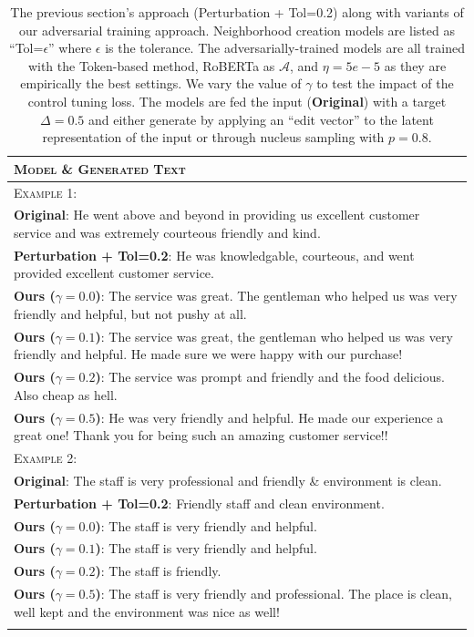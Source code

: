   \begin{table}[htb]
  \small
  \centering
  \caption{The previous section's approach (Perturbation + Tol=0.2) along with variants of our adversarial training approach. Neighborhood creation models are listed as ``Tol=$\epsilon$'' where $\epsilon$ is the tolerance. The adversarially-trained models are all trained with the Token-based method, RoBERTa as $\mathcal{A}$, and $\eta=5e-5$ as they are empirically the best settings. We vary the value of $\gamma$ to test the impact of the control tuning loss. The models are fed the input (\ie \textbf{Original}) with a target $\Delta=0.5$ and either generate by applying an ``edit vector'' to the latent representation of the input or through nucleus sampling with $p=0.8$.}
  \label{tab:ac_example} 
  \begin{tabularx}{\linewidth}{@{}>{\raggedright\arraybackslash}X@{}}
   \toprule[1.5pt]
  \textsc{Model} \& \textsc{Generated Text}\\
  \midrule[0.75pt]
  \textsc{Example 1:}\\
  \textbf{Original}: He went above and beyond in providing us excellent customer service and was extremely courteous friendly and kind.  \\
  \textbf{Perturbation + Tol=0.2}: He was knowledgable, courteous, and went provided excellent customer service.\\
  \textbf{Ours ($\gamma=0.0$)}: The service was great. The gentleman who helped us was very friendly and helpful, but not pushy at all.\\
  \textbf{Ours ($\gamma=0.1$)}:  The service was great, the gentleman who helped us was very friendly and helpful. He made sure we were happy with our purchase!\\
  \textbf{Ours ($\gamma=0.2$)}:  The service was prompt and friendly and the food delicious.  Also cheap as hell.\\
  \textbf{Ours ($\gamma=0.5$)}: He was very friendly and helpful. He made our experience a great one! Thank you for being such an amazing customer service!! \\
  \addlinespace[0.5em]
  \textsc{Example 2:}\\
  \textbf{Original}: The staff is very professional and friendly \& environment is clean.  \\
  \textbf{Perturbation + Tol=0.2}: Friendly staff and clean environment.\\
  \textbf{Ours ($\gamma=0.0$)}: The staff is very friendly and helpful. \\
  \textbf{Ours ($\gamma=0.1$)}: The staff is very friendly and helpful. \\
  \textbf{Ours ($\gamma=0.2$)}:  The staff is friendly.\\
  \textbf{Ours ($\gamma=0.5$)}:  The staff is very friendly and professional.  The place is clean, well kept and the environment was nice as well!\\
  \bottomrule[1.5pt]\\
  \end{tabularx}
  \vspace{-10px}
  \end{table}

